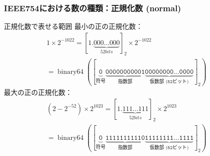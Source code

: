 \documentclass[aspectratio=169]{beamer}
\begin{document}
\begin{frame}\frametitle{IEEE754における数の種類：正規化数 (normal)}
  \begin{block}{正規化数で表せる範囲}
    最小の正の正規化数：
    \begin{gather*}
      1\times 2^{-1022}=[1.\underbrace{000\dots 000}_{52 bits}]_2\times 2^{-1022} \\
      =\operatorname{binary64}(
      [\mathtt{
        \underbrace{0}_{符号}
        \underbrace{000 0000 0001}_{\text{指数部}}
        \underbrace{0000 0000 \dotsc 0000}_{\text{仮数部 (52ビット)}}
      }]_2
      )
    \end{gather*}
    最大の正の正規化数：
    \begin{gather*}
      (2-2^{-52})\times 2^{1023}=
      [1.\underbrace{111\dots 111}_{52 bits}]_2\times 2^{1023} \\
      =\operatorname{binary64}(
      [\mathtt{
        \underbrace{0}_{符号}
        \underbrace{111 1111 1110}_{\text{指数部}}
        \underbrace{1111 1111 \dotsc 1111}_{\text{仮数部 (52ビット)}}
      }]_2
      )
    \end{gather*}
  \end{block}
\end{frame}
\end{document}
